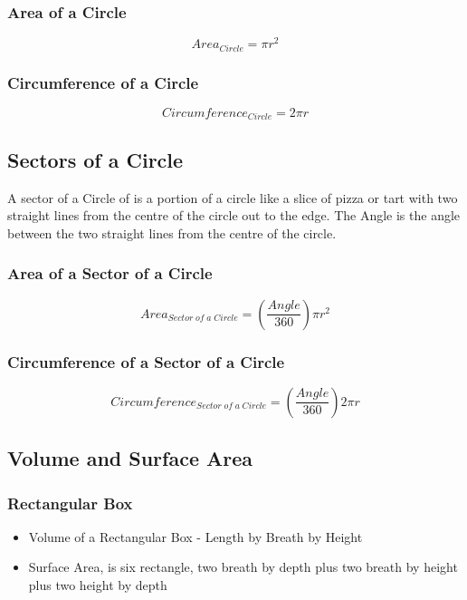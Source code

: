 \documentclass{article}
\begin{document}
\subsubsection{Area of a Circle}
\begin{equation}
Area_{ Circle} = \pi r^ 2
\end{equation}
\subsubsection{Circumference of a Circle}
\begin{equation}
Circumference_{ Circle} = 2 \pi r
\end{equation}
\subsection{Sectors of a Circle}
A sector of a Circle of is a portion of a circle like a slice of pizza or tart with two straight lines from the centre of the circle out to the edge. The Angle is the angle between the two straight lines from the centre of the circle.

\subsubsection{Area of a Sector of a Circle}
\begin{equation}
Area_{ Sector\;of\;a\;Circle} = ( \frac{Angle }{ 360 }) \pi r^ 2
\end{equation}


\subsubsection{Circumference of a Sector of a Circle}
\begin{equation}
Circumference_{ Sector\;of\;a\;Circle} = ( \frac{Angle }{ 360} ) 2 \pi r
\end{equation}

\newpage
\subsection{Volume and Surface Area}
\subsubsection{Rectangular Box}
\begin{itemize}
\item Volume of a Rectangular Box - Length by Breath by Height
\item Surface Area, is six rectangle, two breath by depth plus two breath by height plus two height by depth
\end{itemize}
\end{document}
